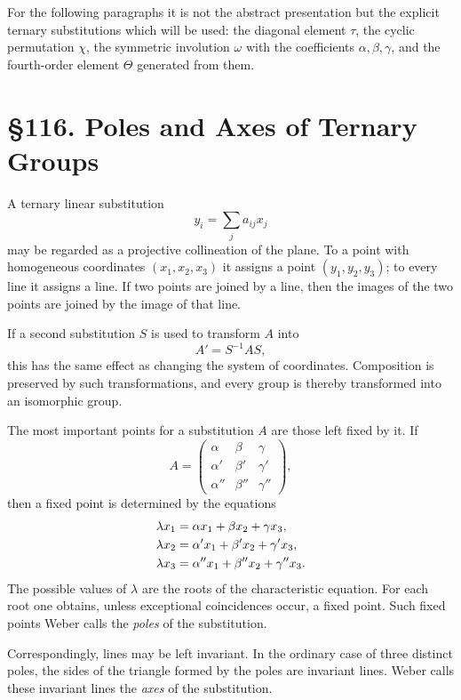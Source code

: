 \documentclass[11pt,a4paper]{book}
\newcommand{\webersection}[2]{\clearpage\section*{\S #1. #2}}
\begin{document}
For the following paragraphs it is not the abstract presentation but the explicit ternary substitutions which will be used: the diagonal element $\tau$, the cyclic permutation $\chi$, the symmetric involution $\omega$ with the coefficients $\alpha,
\beta,
\gamma$, and the fourth-order element $\Theta$ generated from them.

\webersection{116}{Poles and Axes of Ternary Groups}

A ternary linear substitution
\begin{equation}
 y_i=\sum_j a_{ij}x_j
\end{equation}
may be regarded as a projective collineation of the plane.  To a point with homogeneous coordinates $(x_1,x_2,x_3)$ it assigns a point $(y_1,y_2,y_3)$; to every line it assigns a line.  If two points are joined by a line, then the images of the two points are joined by the image of that line.

If a second substitution $S$ is used to transform $A$ into
\[
 A'=S^{-1}AS,
\]
this has the same effect as changing the system of coordinates.  Composition is preserved by such transformations, and every group is thereby transformed into an isomorphic group.

The most important points for a substitution $A$ are those left fixed by it.  If
\begin{equation}
 A=\begin{pmatrix}
 \alpha&\beta&\gamma\\
 \alpha'&\beta'&\gamma'\\
 \alpha''&\beta''&\gamma''
 \end{pmatrix},
\end{equation}
then a fixed point is determined by the equations
\begin{align}
 \lambda x_1&=\alpha x_1+\beta x_2+\gamma x_3,\notag\\
 \lambda x_2&=\alpha' x_1+\beta' x_2+\gamma' x_3,\notag\\
 \lambda x_3&=\alpha''x_1+\beta''x_2+\gamma''x_3.
\end{align}
The possible values of $\lambda$ are the roots of the characteristic equation.  For each root one obtains, unless exceptional coincidences occur, a fixed point.  Such fixed points Weber calls the \emph{poles} of the substitution.

Correspondingly, lines may be left invariant.  In the ordinary case of three distinct poles, the sides of the triangle formed by the poles are invariant lines.  Weber calls these invariant lines the \emph{axes} of the substitution.
\end{document}
